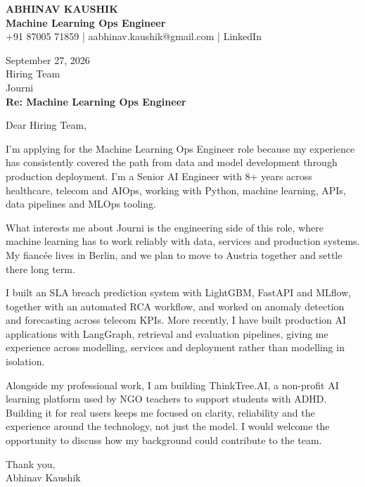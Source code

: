 \documentclass[10pt,a4paper]{article}
\begin{document}
\begin{center}
{\Large\bfseries ABHINAV KAUSHIK}\\[2pt]
{\bfseries Machine Learning Ops Engineer}\\[2pt]
+91 87005 71859 \quad | \quad aabhinav.kaushik@gmail.com \quad | \quad LinkedIn
\end{center}
\vspace{8pt}
September 27, 2026\\[6pt]
Hiring Team\\
Journi\\[4pt]
\textbf{Re: Machine Learning Ops Engineer}

Dear Hiring Team,

I’m applying for the Machine Learning Ops Engineer role because my experience has consistently covered the path from data and model development through production deployment. I’m a Senior AI Engineer with 8+ years across healthcare, telecom and AIOps, working with Python, machine learning, APIs, data pipelines and MLOps tooling.

What interests me about Journi is the engineering side of this role, where machine learning has to work reliably with data, services and production systems. My fiancée lives in Berlin, and we plan to move to Austria together and settle there long term.

I built an SLA breach prediction system with LightGBM, FastAPI and MLflow, together with an automated RCA workflow, and worked on anomaly detection and forecasting across telecom KPIs. More recently, I have built production AI applications with LangGraph, retrieval and evaluation pipelines, giving me experience across modelling, services and deployment rather than modelling in isolation.

Alongside my professional work, I am building ThinkTree.AI, a non-profit AI learning platform used by NGO teachers to support students with ADHD. Building it for real users keeps me focused on clarity, reliability and the experience around the technology, not just the model. I would welcome the opportunity to discuss how my background could contribute to the team.

Thank you,\\
Abhinav Kaushik
\end{document}
